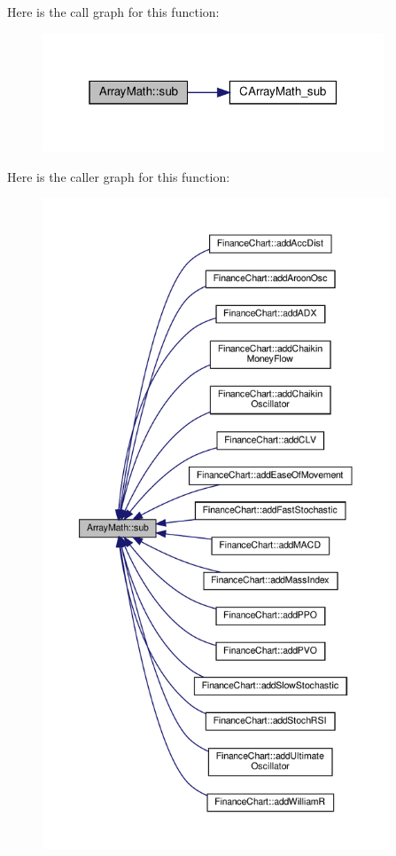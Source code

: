 Here is the call graph for this function\+:
\nopagebreak
\begin{figure}[H]
\begin{center}
\leavevmode
\includegraphics[width=289pt]{class_array_math_a67bc79157b230866a8ed1eb5e6179de0_cgraph}
\end{center}
\end{figure}
Here is the caller graph for this function\+:
\nopagebreak
\begin{figure}[H]
\begin{center}
\leavevmode
\includegraphics[height=550pt]{class_array_math_a67bc79157b230866a8ed1eb5e6179de0_icgraph}
\end{center}
\end{figure}
\mbox{\label{class_array_math_a4c05dccafd9c44167c2e158427ce3099}} 
